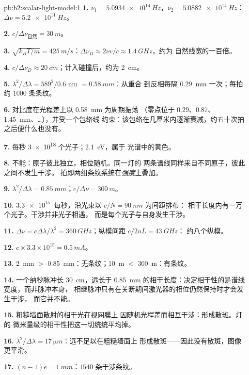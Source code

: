 \begin{solution}{pb:b2:scalar-light-model:1}
\textbf{1.} $\nu_1 = \qty{5.0934e14}{Hz}$，$\nu_2 = \qty{5.0882e14}{Hz}$：$\Delta\nu = \qty{5.2e11}{Hz}$。

\textbf{2.} $c/\Delta\nu_{\text{自然}} = \qty{30}{m}$。

\textbf{3.} $\sqrt{k_BT/m} = \qty{425}{m/s}$：$\Delta\nu_D \approx 2\nu v/c \approx \qty{1.4}{GHz}$，约为
自然线宽的一百倍。

\textbf{4.} $c/\Delta\nu_D \approx \qty{20}{cm}$；计入碰撞后，约为 \qty{2}{cm}。

\textbf{5.} $\lambda^2/\Delta\lambda = 589^2/0.6$ nm $= \qty{0.58}{mm}$：从重合
到反相每隔 \qty{0.29}{mm} 一次；每拍约 $1000$ 条条纹。

\textbf{6.} 对比度在光程差上以 \qty{0.58}{mm} 为周期振荡
（零点位于 $0.29$、$0.87$、\qty{1.45}{mm}、\dots），并受一个包络线
约束：该包络在几厘米内逐渐衰减，约五十次拍之后便什么也没有。

\textbf{7.} 每秒 \qty{3e18}{} 个光子；\qty{2.1}{eV}，属于
光谱中的黄色。

\textbf{8.} 不能：原子彼此独立，相位随机。同一灯的
两条谱线同样来自不同原子，彼此之间不发生干涉。
拍即两组条纹系统在\emph{强度}上叠加。

\textbf{9.} $\lambda^2/\Delta\lambda = \qty{0.85}{mm}$；$c/\Delta\nu = \qty{300}{m}$。

\textbf{10.} $\qty{3.3e15}{}$ 每秒，沿光束以 $c/N = \qty{90}{nm}$ 为间距排布：
相干长度内有一万个光子。干涉并非光子相遇，
而是每个光子与自身发生干涉。

\textbf{11.} $\Delta\nu = c\Delta\lambda/\lambda^2 = \qty{360}{GHz}$；纵模间距 $c/2nL = \qty{43}{GHz}$：
约八个纵模。

\textbf{12.} $e \times 3.3 \times 10^{15} = \qty{0.5}{mA}$。

\textbf{13.} \qty{2}{mm} $>$ \qty{0.85}{mm}：无条纹；\qty{10}{m} $<$ \qty{300}{m}：有条纹。

\textbf{14.} 一个纳秒脉冲长 \qty{30}{cm}，远长于
\qty{0.85}{mm} 的相干长度：决定相干性的是谱线宽度，而非脉冲本身，
相继脉冲只有在关断期间激光器的相位仍然保持时才会发生干涉，
而它并不能。

\textbf{15.} 粗糙墙面散射的相干光在视网膜上
因随机光程差而相互干涉：形成散斑。灯的
微米量级的相干性把这一切统统平均掉。

\textbf{16.} $\lambda^2/\Delta\lambda = \qty{17}{\micro m}$：远不足以在粗糙墙面上
形成散斑——因此没有散斑，图像更平滑。

\textbf{17.} $(n - 1)e = \qty{1}{mm}$：$1540$ 条干涉条纹。


\end{solution}
